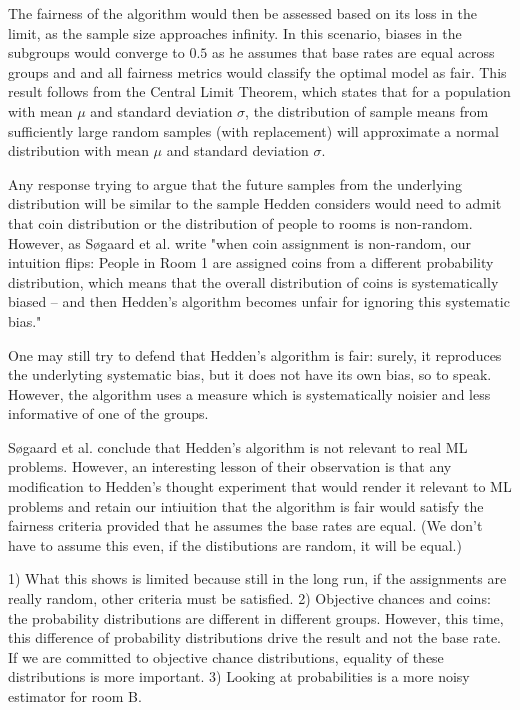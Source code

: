 \documentclass{article}
\begin{document}
The fairness of the algorithm would then be assessed based on its loss in the limit, as the sample size approaches infinity. In this scenario, biases in the subgroups would converge to \(0.5\) as he assumes that base rates are equal across groups and and all fairness metrics would classify the optimal model as fair. This result follows from the Central Limit Theorem, which states that for a population with mean \(\mu\) and standard deviation \(\sigma\), the distribution of sample means from sufficiently large random samples (with replacement) will approximate a normal distribution with mean \(\mu\) and standard deviation \(\sigma\). 


Any response trying to argue that the future samples from the underlying distribution will be similar to the sample Hedden considers would need to admit that coin distribution or the distribution of people to rooms is non-random. However, as Søgaard et al. \citeyear{Sogaard_2024} write "when coin assignment is non-random, our intuition flips: People in Room 1 are assigned coins from a different probability distribution, which means that the overall distribution of coins is systematically biased – and then Hedden’s algorithm becomes unfair for ignoring this systematic bias." 

One may still try to defend that Hedden's algorithm is fair: surely, it reproduces the underlyting systematic bias, but it does not have its own bias, so to speak. However, the algorithm uses a measure which is systematically noisier and less informative of one of the groups. 

Søgaard et al. conclude that Hedden's algorithm is not relevant to real ML problems. However, an interesting lesson of their observation is that any modification to Hedden's thought experiment that would render it relevant to ML problems and retain our intiuition that the algorithm is fair would satisfy the fairness criteria provided that he assumes the base rates are equal. (We don't have to assume this even, if the distibutions are random, it will be equal.)

1) What this shows is limited because still in the long run, if the assignments are really random, other criteria must be satisfied. 
2) Objective chances and coins: the probability distributions are different in different groups. However, this time, this difference of probability distributions drive the result and not the base rate. If we are committed to objective chance distributions, equality of these distributions is more important. 
3) Looking at probabilities is a more noisy estimator for room B. 
\end{document}
